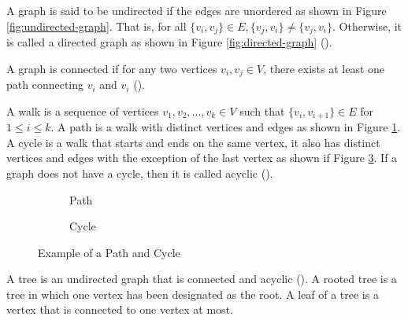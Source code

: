 A graph is said to be undirected if the edges are unordered as shown in Figure \ref{fig:undirected-graph}. That is, for all $\{v_i, v_j\} \in E, \{v_j, v_i\}\neq \{v_j, v_i\}$. Otherwise, it is called a directed graph as shown in Figure \ref{fig:directed-graph} (\cite{diestel2024graph}).

A graph is connected if for any two vertices $v_i, v_j \in V$, there exists at least one path connecting $v_i$ and $v_i$ (\cite{diestel2024graph}).

A walk is a sequence of vertices $v_1, v_2, \ldots, v_k \in V$ such that $\{v_i, v_{i+1}\} \in E$ for $1 \le i \le k$. A path is a walk with distinct vertices and edges as shown in Figure \ref{fig:path}. A cycle is a walk that starts and ends on the same vertex, it also has distinct vertices and edges with the exception of the last vertex as shown if Figure \ref{fig:cycle}. If a graph does not have a cycle, then it is called acyclic (\cite{diestel2024graph}).

\begin{figure}[htb]
    \centering
    \begin{subfigure}{0.4\textwidth}
        \centering
        \caption{Path}
        \label{fig:path}
    \end{subfigure}
    \qquad
    \begin{subfigure}{0.4\textwidth}
        \centering
        \caption{Cycle}
        \label{fig:cycle}
    \end{subfigure}
    \caption{Example of a Path and Cycle}
\end{figure}

A tree is an undirected graph that is connected and acyclic (\cite{diestel2024graph}). A rooted tree is a tree in which one vertex has been designated as the root. A leaf of a tree is a vertex that is connected to one vertex at most.

